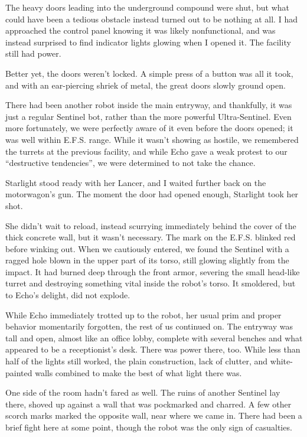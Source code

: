 {\br}%
The heavy doors leading into the underground compound were shut, but what could have been a tedious obstacle instead turned out to be nothing at all. I had approached the control panel knowing it was likely nonfunctional, and was instead surprised to find indicator lights glowing when I opened it. The facility still had power.

Better yet, the doors weren’t locked. A simple press of a button was all it took, and with an ear-piercing shriek of metal, the great doors slowly ground open.

There had been another robot inside the main entryway, and thankfully, it was just a regular Sentinel bot, rather than the more powerful Ultra-Sentinel. Even more fortunately, we were perfectly aware of it even before the doors opened; it was well within E.F.S. range. While it wasn’t showing as hostile, we remembered the turrets at the previous facility, and while Echo gave a weak protest to our “destructive tendencies”, we were determined to not take the chance.

Starlight stood ready with her Lancer, and I waited further back on the motorwagon’s gun. The moment the door had opened enough, Starlight took her shot.

She didn’t wait to reload, instead scurrying immediately behind the cover of the thick concrete wall, but it wasn’t necessary. The mark on the E.F.S. blinked red before winking out. When we cautiously entered, we found the Sentinel with a ragged hole blown in the upper part of its torso, still glowing slightly from the impact. It had burned deep through the front armor, severing the small head-like turret and destroying something vital inside the robot’s torso. It smoldered, but to Echo’s delight, did not explode.

While Echo immediately trotted up to the robot, her usual prim and proper behavior momentarily forgotten, the rest of us continued on. The entryway was tall and open, almost like an office lobby, complete with several benches and what appeared to be a receptionist’s desk. There was power there, too. While less than half of the lights still worked, the plain construction, lack of clutter, and white-painted walls combined to make the best of what light there was.

One side of the room hadn’t fared as well. The ruins of another Sentinel lay there, shoved up against a wall that was pockmarked and charred. A few other scorch marks marked the opposite wall, near where we came in. There had been a brief fight here at some point, though the robot was the only sign of casualties.

